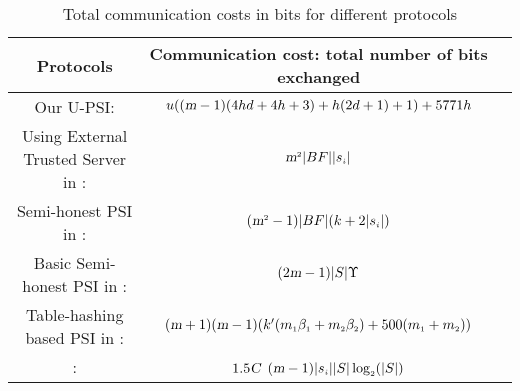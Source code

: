 

\begin{table*}[!htbp]
\begin{footnotesize}
\begin{center}
\caption{\small Total communication costs in bits for different protocols} \label{tbl::update}


\renewcommand{\arraystretch}{1.3}

\begin{tabular}{|c|c|c} 

\hline 
\cellcolor{gray!20} \scriptsize \textbf{Protocols} &\cellcolor{gray!20}\scriptsize  Communication cost: total number of bits exchanged \\
    \hline
    
    \hline



\cellcolor{white!20}  \scriptsize Our U-PSI:&\cellcolor{white!20}\scriptsize $ u((\textsl{m}-1)(4hd+4h+3)+h(2d+1)+1)+5771h$& \\

   \cellcolor{cyan!20}\scriptsize Using External Trusted Server in \cite{DBLP:conf/scn/InbarOP18}:    &\cellcolor{cyan!20}\scriptsize  $\textsl{m}^{\scriptscriptstyle 2}  |BF| |s_{\scriptscriptstyle i}|$  &\\ 

\cellcolor{white!20}  \scriptsize Semi-honest PSI in \cite{DBLP:conf/scn/InbarOP18}: &\cellcolor{white!20}\scriptsize   $(\textsl{m}^{\scriptscriptstyle 2}-1)  |BF| (k+2|s_{\scriptscriptstyle i}|)$&\\ 


 
    \cellcolor{cyan!20}\scriptsize Basic Semi-honest PSI in \cite{DBLP:conf/pkc/HazayV17}:      &\cellcolor{cyan!20}\scriptsize$(2  \textsl{m} - 1)  |S|  \Upsilon$&\\ 
    
        \cellcolor{white!20}\scriptsize Table-hashing based PSI in \cite{DBLP:conf/ccs/KolesnikovMPRT17}:      &\cellcolor{white!20}\scriptsize$(\textsl{m} +1)(\textsl{m} -1)( k'  (m_{\scriptscriptstyle 1}  \beta_{\scriptscriptstyle 1} + m_{\scriptscriptstyle 2}  \beta_{\scriptscriptstyle 2}) + 500(m_{\scriptscriptstyle 1}+m_{\scriptscriptstyle 2}) )$&\\ 
        
        \cellcolor{cyan!20}\scriptsize  \cite{DBLP:conf/ccs/ChenLR17}:      &\cellcolor{cyan!20}\scriptsize$1.5 \textsl {C}$ $(\textsl{m}-1) |s_{\scriptscriptstyle i}| |S| \log_{\scriptscriptstyle 2}(|S|)$&\\ 



\end{tabular}
\end{center}
\end{footnotesize}
\end{table*}
